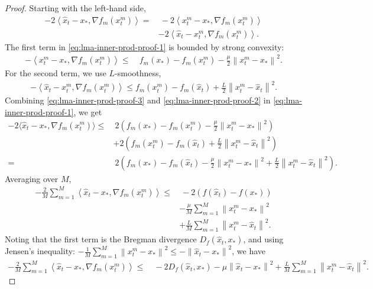 \documentclass[sn-mathphys,Numbered]{sn-jnl}%
\renewcommand{\|}{\parallel}
\newcommand\ev[1]{\left \langle #1 \right \rangle}
\newcommand\br[1]{\left ( #1 \right )}
\newcommand{\sqn}[1]{{\left\lVert#1\right\rVert}^2}
\renewcommand {\*} {\ast}
\begin{document}
\begin{proof}
    Starting with the left-hand side,
    \begin{align}
        \label{eq:lma-inner-prod-proof-1}
        - 2  \ev{\hat{x}_t - x_\ast, \nabla f_m (x_t^m)} =&\ - 2  \ev{x_t^m - x_\ast, \nabla f_m (x_t^m)} \nonumber \\  &- 2  \ev{\hat{x}_t - x_t^m, \nabla f_m (x_t^m)}.
    \end{align}
    The first term in \eqref{eq:lma-inner-prod-proof-1} is bounded by strong convexity:
    \begin{align}
        \label{eq:lma-inner-prod-proof-2}
        - \ev{x_t^m - x_\ast, \nabla f_m (x_t^m)} \leq&\ f_m (x_\ast) - f_m (x_t^m) - \frac{\mu}{2} \sqn{x_t^m - x_\ast}.
    \end{align}
    For the second term, we use $L$-smoothness,
    \begin{align}
        \label{eq:lma-inner-prod-proof-3}
        - \ev{\hat{x}_t  - x_t^m, \nabla f_m (x_t^m)} \leq f_m (x_t^m) - f_m (\hat{x}_t) + \frac{L}{2} \sqn{x_t^m - \hat{x}_t}.
    \end{align}
    Combining \eqref{eq:lma-inner-prod-proof-3} and \eqref{eq:lma-inner-prod-proof-2} in \eqref{eq:lma-inner-prod-proof-1}, we get
    \begin{align*}
        - 2  \langle\hat{x}_t - x_\ast, \nabla f_m (x_t^m) \rangle  \leq&\ 2  \br{f_m (x_\ast) - f_m (x_t^m) - \frac{\mu}{2} \sqn{x_t^m - x_\ast}} \\
        &+ 2  \br{f_m (x_t^m) - f_m (\hat{x}_t) + \frac{L}{2} \sqn{x_t^m - \hat{x}_t}} \\
        =&\ 2  \br{f_m (x_\ast) - f_m (\hat{x}_t) - \frac{\mu}{2} \sqn{x_t^m - x_\ast} + \frac{L}{2} \sqn{x_t^m - \hat{x}_t}}.
    \end{align*}
    Averaging over $M$,
    \begin{align*}
        -\frac{2 }{M} \sum_{m=1}^{M} \ev{\hat{x}_t - x_\ast, \nabla f_m (x_t^m)} \leq&\ - 2  \br{f(\hat{x}_t) - f(x_\ast)} \\ &- \frac{ \mu}{M} \sum_{m=1}^{M} \sqn{x_t^m - x_\ast} \\ &+ \frac{ L}{M} \sum_{m=1}^{M} \sqn{x_t^m - \hat{x}_t}.
    \end{align*}
    Noting that the first term is the Bregman divergence $D_{f} (\hat{x}_t, x_\ast)$, and using Jensen's inequality: $- \frac{1}{M} \sum_{m=1}^{M} \sqn{x_t^m - x_\ast} \leq - \sqn{\hat{x}_t - x_\ast}$, we have
    \begin{align*}
        -\frac{2 }{M} \sum_{m=1}^{M} \ev{\hat{x}_t - x_\ast, \nabla f_m (x_t^m)} \leq&\ - 2  D_{f} (\hat{x}_t, x_\ast) -  \mu \sqn{\hat{x}_t - x_\ast} +  \frac{ L}{M} \sum_{m=1}^{M} \sqn{x_t^m - \hat{x}_t}.

\end{align*}
\end{proof}
\end{document}
